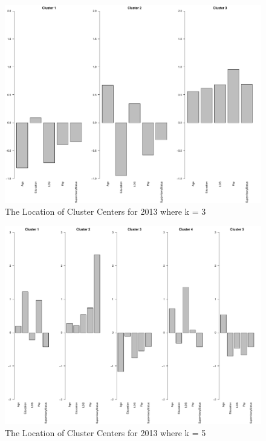 \documentclass{article}
\begin{document}
    \begin{center}
        \begin{figure}
            \includegraphics[scale=0.4]{./images/3-cluster-center-2013.pdf}
            \caption{The Location of Cluster Centers for 2013 where k = 3}
            \label{fig:2}
        \end{figure}
    \end{center}

    \begin{center}
        \begin{figure}
            \includegraphics[scale=0.4]{./images/5-cluster-center-2013.pdf}
            \caption{The Location of Cluster Centers for 2013 where k = 5}
            \label{fig:3}
        \end{figure}
    \end{center}
\end{document}
